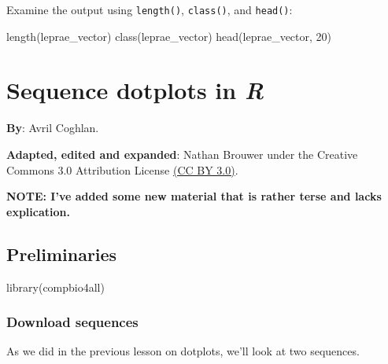 \documentclass[
]{book}
\newenvironment{Shaded}{\begin{snugshade}}{\end{snugshade}}
\newcommand{\DecValTok}[1]{\textcolor[rgb]{0.00,0.00,0.81}{#1}}
\newcommand{\FunctionTok}[1]{\textcolor[rgb]{0.00,0.00,0.00}{#1}}
\newcommand{\NormalTok}[1]{#1}
\begin{document}
Examine the output using \texttt{length()}, \texttt{class()}, and \texttt{head()}:

\begin{Shaded}
\begin{Highlighting}[]
\FunctionTok{length}\NormalTok{(leprae\_vector)}
\FunctionTok{class}\NormalTok{(leprae\_vector)}
\FunctionTok{head}\NormalTok{(leprae\_vector, }\DecValTok{20}\NormalTok{)}
\end{Highlighting}
\end{Shaded}

\hypertarget{sequence-dotplots-in-r}{%
\chapter{\texorpdfstring{Sequence dotplots in \emph{R}}{Sequence dotplots in R}}\label{sequence-dotplots-in-r}}

\textbf{By}: Avril Coghlan.

\textbf{Adapted, edited and expanded}: Nathan Brouwer under the Creative Commons 3.0 Attribution License \href{https://creativecommons.org/licenses/by/3.0/}{(CC BY 3.0)}.

\textbf{NOTE: I've added some new material that is rather terse and lacks explication.}

\hypertarget{preliminaries-4}{%
\section{Preliminaries}\label{preliminaries-4}}

\begin{Shaded}
\begin{Highlighting}[]
\FunctionTok{library}\NormalTok{(compbio4all)}
\end{Highlighting}
\end{Shaded}

\hypertarget{download-sequences}{%
\subsection{Download sequences}\label{download-sequences}}

As we did in the previous lesson on dotplots, we'll look at two sequences.
\end{document}
